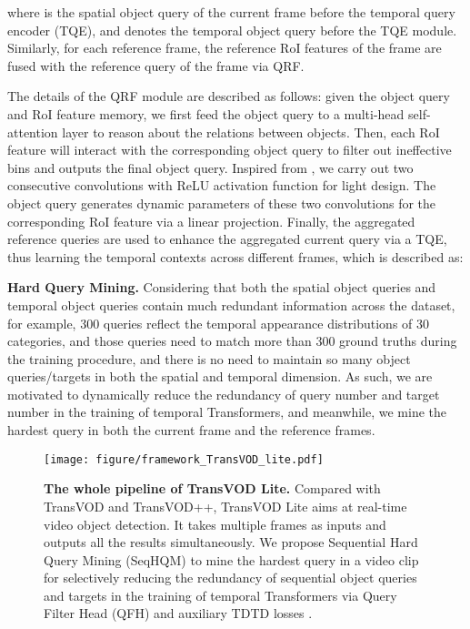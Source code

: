 \documentclass[10pt,journal,compsoc]{IEEEtran}
\begin{document}
where  is the spatial object query of the current frame before the  temporal query encoder (TQE), and  denotes the temporal object query before the  TQE module.
Similarly, for each reference frame, the reference RoI features  of the  frame are fused with the reference query of the  frame via QRF. 


The details of the QRF module are described as follows: given the object query and RoI feature memory, we first feed the object query to a multi-head self-attention layer to reason about the relations between objects. Then, each RoI feature will interact with the corresponding object query to filter out ineffective bins and outputs the final object query. Inspired from \cite{sun2021sparse}, we carry out two consecutive  convolutions with ReLU activation function for light design. 
The  object query generates dynamic parameters of these two convolutions for the corresponding  RoI feature via a linear projection.
Finally, the aggregated reference queries  are used to enhance the aggregated current query  via a TQE, thus learning the temporal contexts across different frames, which is described as: 


\noindent
\textbf{Hard Query Mining.}
Considering that both the spatial object queries and temporal object queries contain much redundant information across the dataset, for example, 300 queries reflect the temporal appearance distributions of 30 categories, and those queries need to match more than 300 ground truths during the training procedure, and there is no need to maintain so many object queries/targets in both the spatial and temporal dimension. As such, we are motivated to dynamically reduce the redundancy of query number and target number in the training of temporal Transformers, and meanwhile, we mine the hardest query in both the current frame and the reference frames.

\begin{figure*}[h]
    \centering
    \texttt{[image: figure/framework\_TransVOD\_lite.pdf]} 
    \vspace{-6mm}
    \caption{\small \textbf{The whole pipeline of TransVOD Lite.} Compared with TransVOD and TransVOD++, TransVOD Lite aims at real-time video object detection. It takes multiple frames as inputs and outputs all the results simultaneously. We propose Sequential Hard Query Mining (SeqHQM) to mine the hardest query in a video clip for selectively reducing the redundancy of sequential object queries and targets in the training of temporal Transformers via Query Filter Head (QFH) and auxiliary TDTD losses . }
    \vspace{-5mm}
    \label{fig:framework_tranvod_lite}
\end{figure*}
\end{document}

